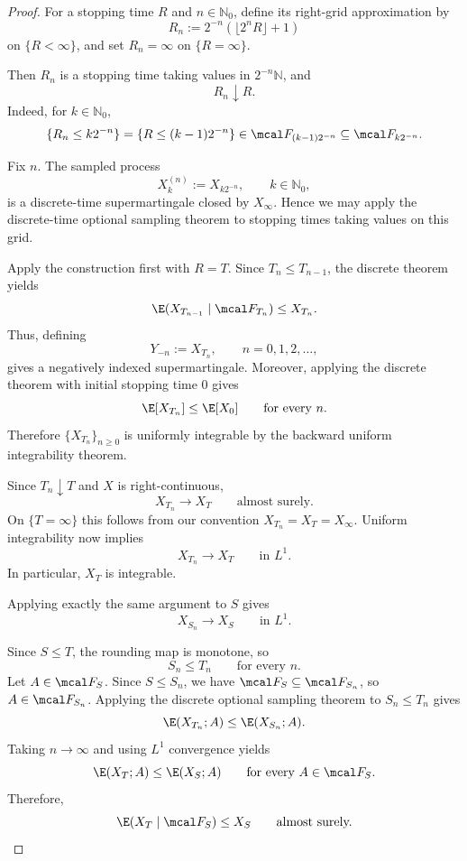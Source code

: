 \begin{proof}
For a stopping time $R$ and $n\in\mathbb N_0$, define its right-grid
approximation by
\[
    R_n
    :=
    2^{-n}\left(\lfloor 2^nR\rfloor+1\right)
\]
on $\{R<\infty\}$, and set $R_n=\infty$ on $\{R=\infty\}$.

Then $R_n$ is a stopping time taking values in
$2^{-n}\mathbb N$, and
\[
    R_n\downarrow R.
\]
Indeed, for $k\in\mathbb N_0$,
\[
    \{R_n\leq k2^{-n}\}
    =
    \{R\leq (k-1)2^{-n}\}
    \in\mcal F_{(k-1)2^{-n}}
    \subseteq\mcal F_{k2^{-n}}.
\]

Fix $n$. The sampled process
\[
    X^{(n)}_k:=X_{k2^{-n}},
    \qquad k\in\mathbb N_0,
\]
is a discrete-time supermartingale closed by $X_\infty$. Hence we may
apply the discrete-time optional sampling theorem to stopping times
taking values on this grid.

Apply the construction first with $R=T$. Since $T_n\leq T_{n-1}$,
the discrete theorem yields
\[
    \E(X_{T_{n-1}}\mid\mcal F_{T_n})
    \leq X_{T_n}.
\]
Thus, defining
\[
    Y_{-n}:=X_{T_n},
    \qquad n=0,1,2,\ldots,
\]
gives a negatively indexed supermartingale. Moreover, applying the
discrete theorem with initial stopping time $0$ gives
\[
    \E[X_{T_n}]\leq \E[X_0]
    \qquad\text{for every }n.
\]
Therefore $\{X_{T_n}\}_{n\geq 0}$ is uniformly integrable by the
backward uniform integrability theorem.

Since $T_n\downarrow T$ and $X$ is right-continuous,
\[
    X_{T_n}\longrightarrow X_T
    \qquad\text{almost surely.}
\]
On $\{T=\infty\}$ this follows from our convention
$X_{T_n}=X_T=X_\infty$. Uniform integrability now implies
\[
    X_{T_n}\longrightarrow X_T
    \qquad\text{in }L^1.
\]
In particular, $X_T$ is integrable.

Applying exactly the same argument to $S$ gives
\[
    X_{S_n}\longrightarrow X_S
    \qquad\text{in }L^1.
\]

Since $S\leq T$, the rounding map is monotone, so
\[
    S_n\leq T_n
    \qquad\text{for every }n.
\]
Let $A\in\mcal F_S$. Since $S\leq S_n$, we have
$\mcal F_S\subseteq\mcal F_{S_n}$, so $A\in\mcal F_{S_n}$. Applying
the discrete optional sampling theorem to $S_n\leq T_n$ gives
\[
    \E(X_{T_n};A)\leq \E(X_{S_n};A).
\]
Taking $n\to\infty$ and using $L^1$ convergence yields
\[
    \E(X_T;A)\leq \E(X_S;A)
    \qquad\text{for every }A\in\mcal F_S.
\]
Therefore,
\[
    \E(X_T\mid\mcal F_S)\leq X_S
    \qquad\text{almost surely.}
\]
\end{proof}



